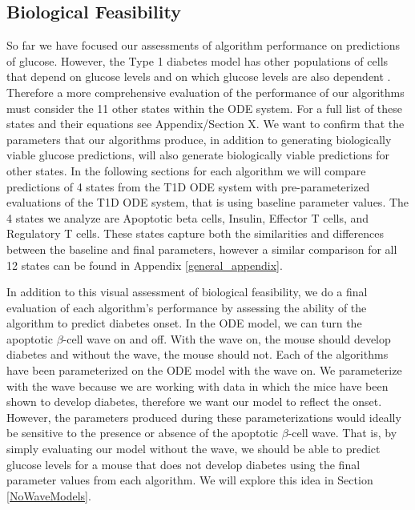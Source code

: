 \subsection{Biological Feasibility} \label{Results_Biological_Feasibility}
So far we have focused our assessments of algorithm performance on predictions of glucose. However, the Type 1 diabetes model has other populations of cells that depend on glucose levels and on which glucose levels are also dependent \cite{shtylla2019mathematical}. Therefore a more comprehensive evaluation of the performance of our algorithms must consider the 11 other states within the ODE system. For a full list of these states and their equations see Appendix/Section X. We want to confirm that the parameters that our algorithms produce, in addition to generating biologically viable glucose predictions, will also generate biologically viable predictions for other states.  In the following sections for each algorithm we will compare predictions of 4 states from the T1D ODE system with pre-parameterized evaluations of the T1D ODE system, that is using baseline parameter values. The 4 states we analyze are Apoptotic beta cells, Insulin, Effector T cells, and Regulatory T cells. These states capture both the similarities and differences between the baseline and final parameters, however a similar comparison for all 12 states can be found in Appendix \ref{general_appendix}. 
\par In addition to this visual assessment of biological feasibility, we do a final evaluation of each algorithm's performance by assessing the ability of the algorithm to predict diabetes onset. In the ODE model, we can turn the apoptotic $\beta$-cell wave on and off. With the wave on, the mouse should develop diabetes and without the wave, the mouse should not. Each of the algorithms have been parameterized on the ODE model with the wave on. We parameterize with the wave because we are working with data in which the mice have been shown to develop diabetes, therefore we want our model to reflect the onset. However, the parameters produced during these parameterizations would ideally be sensitive to the presence or absence of the apoptotic $\beta$-cell wave. That is, by simply evaluating our model without the wave, we should be able to predict glucose levels for a mouse that does not develop diabetes using the final parameter values from each algorithm. We will explore this idea in Section \ref{NoWaveModels}.
